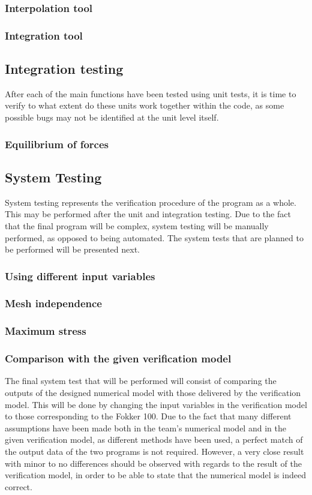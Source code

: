 \subsubsection{Interpolation tool}
\subsubsection{Integration tool}


\subsection{Integration testing}
After each of the main functions have been tested using unit tests, it is time to verify to what extent do these units work together within the code, as some possible bugs may not be identified at the unit level itself.

\subsubsection{Equilibrium of forces}

\subsection{System Testing}
System testing represents the verification procedure of the program as a whole. This may be performed after the unit and integration testing. Due to the fact that the final program will be complex, system testing will be manually performed, as opposed to being automated. The system tests that are planned to be performed will be presented next.

\subsubsection{Using different input variables}
\subsubsection{Mesh independence}
\subsubsection{Maximum stress}
\subsubsection{Comparison with the given verification model}
The final system test that will be performed will consist of comparing the outputs of the designed numerical model with those delivered by the verification model. This will be done by changing the input variables in the verification model to those corresponding to the Fokker 100. Due to the fact that many different assumptions have been made both in the team's numerical model and in the given verification model, as different methods have been used, a perfect match of the output data of the two programs is not required. However, a very close result with minor to no differences should be observed with regards to the result of the verification model, in order to be able to state that the numerical model is indeed correct. 




